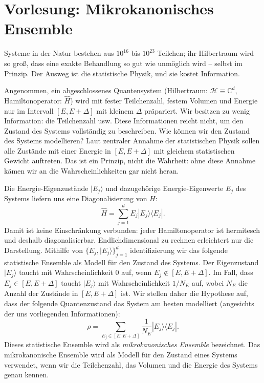 
\section{Vorlesung: Mikrokanonisches Ensemble}
Systeme in der Natur bestehen aus $10^{16}$ bis $10^{23}$ Teilchen; ihr Hilbertraum wird so groß, dass eine exakte Behandlung so gut wie unmöglich wird -- selbst im Prinzip. Der Ausweg ist die statistische Physik, und sie kostet Information.

Angenommen, ein abgeschlossenes Quantensystem (Hilbertraum: $\mathcal{H}\equiv \mathbb{C}^d$, Hamiltonoperator: $\widehat{H}$) wird mit fester Teilchenzahl, festem Volumen und Energie nur im Intervall $[E, E+\Delta]$ mit kleinem $\Delta$ präpariert. Wir besitzen zu wenig Information: die Teilchenzahl usw. Diese Informationen reicht nicht, um den Zustand des Systems vollständig zu beschreiben. Wie können wir den Zustand des Systems modellieren? Laut zentraler Annahme der statistischen Physik sollen alle Zustände mit einer Energie in $[E, E+\Delta]$ mit gleichem statistischen Gewicht auftreten. Das ist ein Prinzip, nicht die Wahrheit: ohne diese Annahme kämen wir an die Wahrscheinlichkeiten gar nicht heran.

Die Energie-Eigenzustände $|E_j\rangle$ und dazugehörige Energie-Eigenwerte $E_j$ des Systems liefern uns eine Diagonalisierung von $H$:
\begin{equation}
  \widehat{H} = \sum_{j=1}^d E_j |E_j\rangle \langle E_j|.
\end{equation}
Damit ist keine Einschränkung verbunden: jeder Hamiltonoperator ist hermitesch und deshalb diagonalisierbar. Endlichdimensional zu rechnen erleichtert nur die Darstellung.
Mithilfe von $\{E_j, |E_j\rangle \}_{j=1}^d$ identifizierung wir das folgende statistische Ensemble als Modell für den Zustand des Systems. Der Eigenzustand $|E_j\rangle$ taucht mit Wahrscheinlichkeit $0$ auf, wenn $E_j\not\in [E,E+\Delta]$. Im Fall, dass $E_j\in [E,E+\Delta]$ taucht $|E_j\rangle$ mit Wahrscheinlichkeit $1/N_E$ auf, wobei $N_E$ die Anzahl der Zustände in $[E, E+\Delta]$ ist. Wir stellen daher die Hypothese auf, dass der folgende Quantenzustand das System am besten modelliert (angesichts der uns vorliegenden Informationen):
\begin{equation}
  \rho = \sum_{E_j\in [E,E+\Delta]} \frac{1}{N_E} |E_j\rangle \langle E_j|.
\end{equation} 
Dieses statistische Ensemble wird als \emph{mikrokanonisches Ensemble} bezeichnet. Das mikrokanonische Ensemble wird als Modell für den Zustand eines Systems verwendet, wenn wir die Teilchenzahl, das Volumen und die Energie des Systems genau kennen.

